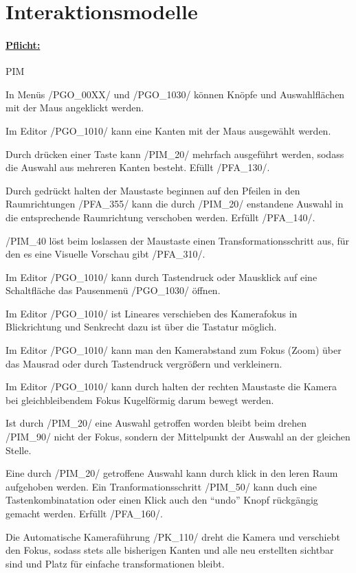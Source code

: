 %
%


%
%
\clearpage


\section{Interaktionsmodelle}
\label{NU:Interaktion}


\paragraph*{\underline{Pflicht:}}

\begin{ids}{\gls{PIM}}

	\id[10] In Menüs /PGO\_00XX/ und /PGO\_1030/ können Knöpfe und Auswahlflächen mit der Maus angeklickt werden.
	
	\id[20] Im Editor /PGO\_1010/ kann eine Kanten mit der Maus ausgewählt werden.
	
	\id[30] Durch drücken einer Taste kann /PIM\_20/ mehrfach ausgeführt werden, sodass die Auswahl aus mehreren Kanten besteht. Efüllt /PFA\_130/.
	
	\id[40] Durch gedrückt halten der Maustaste beginnen auf den Pfeilen in den Raumrichtungen /PFA\_355/ kann die durch /PIM\_20/ enstandene Auswahl in die entsprechende Raumrichtung verschoben werden. Erfüllt /PFA\_140/.
	
	\id[50] /PIM\_40 löst beim loslassen der Maustaste einen Transformationsschritt aus, für den es eine Visuelle Vorschau gibt /PFA\_310/.
	
	\id[60] Im Editor /PGO\_1010/ kann durch Tastendruck oder Mausklick auf eine Schaltfläche das Pausenmenü /PGO\_1030/ öffnen.
	
	\id[70] Im Editor /PGO\_1010/ ist Lineares verschieben des Kamerafokus in Blickrichtung und Senkrecht dazu ist über die Tastatur möglich.
	
	\id[80] Im Editor /PGO\_1010/ kann man den Kamerabstand zum Fokus (Zoom) über das Mausrad oder durch Tastendruck vergrößern und verkleinern.
	
	\id[90] Im Editor /PGO\_1010/ kann durch halten der rechten Maustaste die Kamera bei gleichbleibendem Fokus Kugelförmig darum bewegt werden.
	
	\id[100] Ist durch /PIM\_20/ eine Auswahl getroffen worden bleibt beim drehen /PIM\_90/ nicht der Fokus, sondern der Mittelpunkt der Auswahl an der gleichen Stelle.
	
	\id[110] Eine durch /PIM\_20/ getroffene Auswahl kann durch klick in den leren Raum aufgehoben werden.
	\id[120] Ein Tranformationsschritt /PIM\_50/ kann duch eine Tastenkombinatation oder einen Klick auch den "`undo"' Knopf rückgängig gemacht werden. Erfüllt /PFA\_160/.
	
	\id[130] Die Automatische Kameraführung /PK\_110/ dreht die Kamera und verschiebt den Fokus, sodass stets alle bisherigen Kanten und alle neu erstellten sichtbar sind und Platz für einfache transformationen bleibt.

\end{ids}


